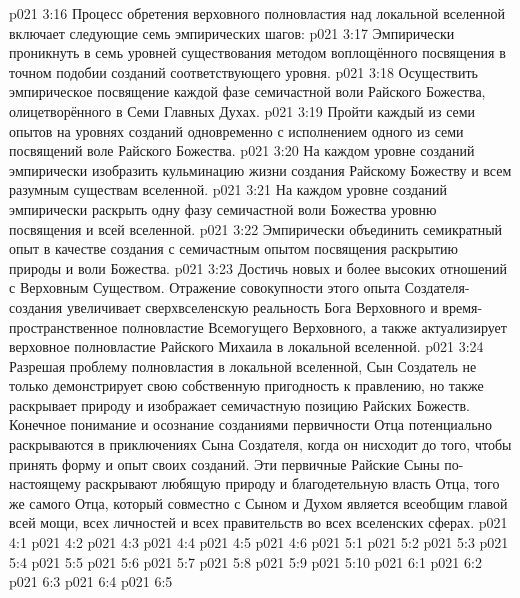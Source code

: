 \vs p021 3:16 \pc Процесс обретения верховного полновластия над локальной вселенной включает следующие семь эмпирических шагов:
\vs p021 3:17 Эмпирически проникнуть в семь уровней существования методом воплощённого посвящения в точном подобии созданий соответствующего уровня.
\vs p021 3:18 Осуществить эмпирическое посвящение каждой фазе семичастной воли Райского Божества, олицетворённого в Семи Главных Духах.
\vs p021 3:19 Пройти каждый из семи опытов на уровнях созданий одновременно с исполнением одного из семи посвящений воле Райского Божества.
\vs p021 3:20 На каждом уровне созданий эмпирически изобразить кульминацию жизни создания Райскому Божеству и всем разумным существам вселенной.
\vs p021 3:21 На каждом уровне созданий эмпирически раскрыть одну фазу семичастной воли Божества уровню посвящения и всей вселенной.
\vs p021 3:22 Эмпирически объединить семикратный опыт в качестве создания с семичастным опытом посвящения раскрытию природы и воли Божества.
\vs p021 3:23 Достичь новых и более высоких отношений с Верховным Существом. Отражение совокупности этого опыта Создателя\hyp{}создания увеличивает сверхвселенскую реальность Бога Верховного и время\hyp{}пространственное полновластие Всемогущего Верховного, а также актуализирует верховное полновластие Райского Михаила в локальной вселенной.
\vs p021 3:24 \pc Разрешая проблему полновластия в локальной вселенной, Сын Создатель не только демонстрирует свою собственную пригодность к правлению, но также раскрывает природу и изображает семичастную позицию Райских Божеств. Конечное понимание и осознание созданиями первичности Отца потенциально раскрываются в приключениях Сына Создателя, когда он нисходит до того, чтобы принять форму и опыт своих созданий. Эти первичные Райские Сыны по\hyp{}настоящему раскрывают любящую природу и благодетельную власть Отца, того же самого Отца, который совместно с Сыном и Духом является всеобщим главой всей мощи, всех личностей и всех правительств во всех вселенских сферах.
\vs p021 4:1 
\vs p021 4:2 
\vs p021 4:3 
\vs p021 4:4 
\vs p021 4:5 \pc 
\vs p021 4:6 \pc 
{}
\vs p021 5:1 
\vs p021 5:2 
\vs p021 5:3 
\vs p021 5:4 
\vs p021 5:5 \pc 
\vs p021 5:6 \pc 
\vs p021 5:7 
\vs p021 5:8 \pc 
\vs p021 5:9 
\vs p021 5:10 
\vs p021 6:1 
\vs p021 6:2 
\vs p021 6:3 
\vs p021 6:4 
\vsetoff
\vs p021 6:5 
\quizlink
